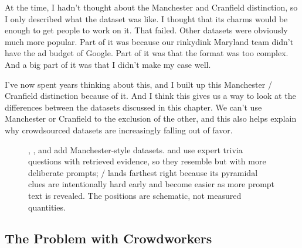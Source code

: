 At the time, I hadn't thought about the Manchester and Cranfield
distinction, so I only described what the dataset was like.
%
I thought that its charms would be enough to get people to work on it.  
%
That failed.  Other datasets were obviously much more popular.  
%
Part of it was because our rinkydink Maryland team didn't have the ad
budget of Google.  Part of it was that the format was too complex.
And a big part of it was that I didn't make my case well.

I've now spent years thinking about this, and I built up this
Manchester / Cranfield distinction because of it.
%
And I think this gives us a way to look at the differences between the
datasets discussed in this chapter.
%
We can't use Manchester or Cranfield to the exclusion of the other,
and this also helps explain why crowdsourced datasets are increasingly
falling out of favor.

\begin{figure}
\centering
{}
\caption{\searchqa{}, \triviaqa{}, and \qanta{} add Manchester-style
  datasets.  \searchqa{} and \triviaqa{} use expert trivia questions with
  retrieved evidence, so they resemble  but with more deliberate
  prompts; \qanta{} / \quizbowl{} lands farthest right because its
  pyramidal clues are intentionally hard early and become easier as more
  prompt text is revealed.  The positions are schematic, not measured
  quantities.}
\label{fig:datasets-plot-final}
\end{figure}

\subsection{The Problem with Crowdworkers}
\label{sec:nq:iid}

